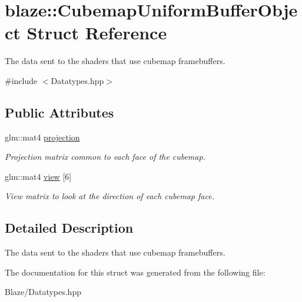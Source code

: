 \hypertarget{structblaze_1_1CubemapUniformBufferObject}{}\section{blaze\+:\+:Cubemap\+Uniform\+Buffer\+Object Struct Reference}
\label{structblaze_1_1CubemapUniformBufferObject}


The data sent to the shaders that use cubemap framebuffers.  




{\ttfamily \#include $<$Datatypes.\+hpp$>$}

\subsection*{Public Attributes}
\begin{DoxyCompactItemize}
\item 
\mbox{\label{structblaze_1_1CubemapUniformBufferObject_a342a1d767d3faf8e0654a571bc0559f4}} 
glm\+::mat4 \hyperlink{structblaze_1_1CubemapUniformBufferObject_a342a1d767d3faf8e0654a571bc0559f4}{projection}
\begin{DoxyCompactList}\small\item\em Projection matrix common to each face of the cubemap. \end{DoxyCompactList}\item 
\mbox{\label{structblaze_1_1CubemapUniformBufferObject_a1e2d68025d9dfc071676536d18f8c303}} 
glm\+::mat4 \hyperlink{structblaze_1_1CubemapUniformBufferObject_a1e2d68025d9dfc071676536d18f8c303}{view} \mbox{[}6\mbox{]}
\begin{DoxyCompactList}\small\item\em View matrix to look at the direction of each cubemap face. \end{DoxyCompactList}\end{DoxyCompactItemize}


\subsection{Detailed Description}
The data sent to the shaders that use cubemap framebuffers. 

The documentation for this struct was generated from the following file\+:\begin{DoxyCompactItemize}
\item 
Blaze/Datatypes.\+hpp\end{DoxyCompactItemize}
